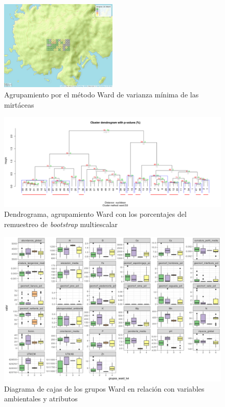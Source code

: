 \documentclass[11pt,]{article}
\begin{document}
\begin{figure}
\centering
\includegraphics[width=0.50000\textwidth]{mapa_ward_k4.png}
\caption{Agrupamiento por el método Ward de varianza mínima de las
mirtáceas \label{fig:mapa_ward}}
\end{figure}

\begin{figure}
\centering
\includegraphics{bootstrap_Ward.png}
\caption{Dendrograma, agrupamiento Ward con los porcentajes del
remuestreo de \emph{bootstrap} multiescalar
\label{fig:*bootstrap*_multiescalar}}
\end{figure}

\begin{figure}
\centering
\includegraphics{correlograma_wardyvariablesambientales.png}
\caption{Diagrama de cajas de los grupos Ward en relación con variables
ambientales y atributos \label{fig:ward_con_variables}}
\end{figure}
\end{document}
